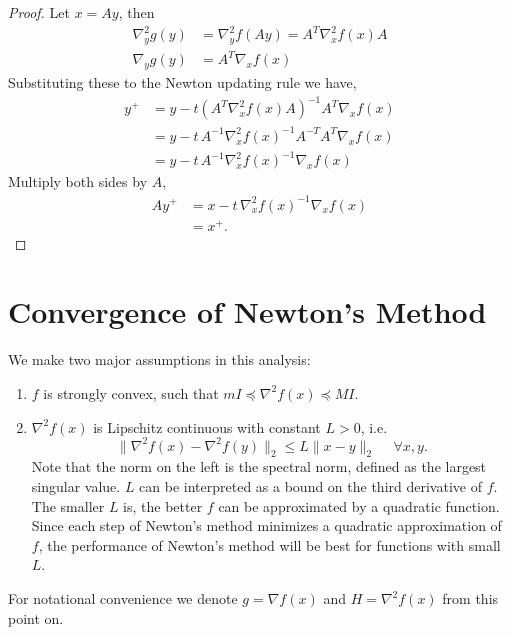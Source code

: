 \documentclass[12pt]{report}
\begin{document}
\begin{proof}
Let $x=Ay$, then
\begin{align}
\nabla^2_y g(y) & = \nabla^2_y f(Ay) = A^T \nabla^2_x f(x) A
\\ \nabla_y g(y) & = A^T \nabla_x f(x)
\end{align}
Substituting these to the Newton updating rule we have,
\begin{align*}
y^{+} & = y - t \left(A^T \nabla^2_x f(x) A \right)^{-1} A^T \nabla_x f(x)
	\\ & = y - t\, A^{-1} \nabla^2_x f(x)^{-1} A^{-T} A^T \nabla_x f(x)
	\\ & = y - t\, A^{-1} \nabla^2_x f(x)^{-1} \nabla_x f(x)
\end{align*}
Multiply both sides by $A$,
\begin{align*}
Ay^{+} & = x - t\,  \nabla^2_x f(x)^{-1} \nabla_x f(x) 
	\\ & = x^{+}. 
\end{align*}
\end{proof}

\section{Convergence of Newton's Method}
We make two major assumptions in this analysis:
\begin{enumerate}
    \item $f$ is strongly convex, such that $mI \preceq \nabla^2 f(x) \preceq MI$.
    \item $\nabla^2 f(x)$ is Lipschitz continuous with constant $L>0$, i.e.
    \begin{equation}
        \| \nabla^2 f(x) - \nabla^2 f(y)  \|_2 \leq L \| x - y\|_2 \hspace{15pt} \forall x,y.
    \end{equation}
    Note that the norm on the left is the spectral norm, defined as the largest singular value. $L$ can be interpreted as a bound on the third derivative of $f$. The smaller $L$ is, the better $f$ can be approximated by a quadratic function. Since each step of Newton's method minimizes a quadratic approximation of $f$, the performance of Newton's method will be best for functions with small $L$.
\end{enumerate}

For notational convenience we denote $g=\nabla f(x)$ and $H=\nabla^2 f(x)$ from this point on. 
\end{document}
